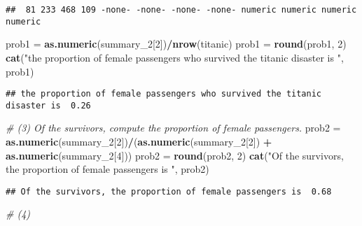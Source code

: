 \documentclass[]{article}
\newenvironment{Shaded}{\begin{snugshade}}{\end{snugshade}}
\newcommand{\KeywordTok}[1]{\textcolor[rgb]{0.13,0.29,0.53}{\textbf{#1}}}
\newcommand{\DecValTok}[1]{\textcolor[rgb]{0.00,0.00,0.81}{#1}}
\newcommand{\StringTok}[1]{\textcolor[rgb]{0.31,0.60,0.02}{#1}}
\newcommand{\CommentTok}[1]{\textcolor[rgb]{0.56,0.35,0.01}{\textit{#1}}}
\newcommand{\OperatorTok}[1]{\textcolor[rgb]{0.81,0.36,0.00}{\textbf{#1}}}
\newcommand{\NormalTok}[1]{#1}
\begin{document}
\begin{verbatim}
##  81 233 468 109 -none- -none- -none- -none- numeric numeric numeric numeric
\end{verbatim}

\begin{Shaded}
\begin{Highlighting}[]
\NormalTok{prob1 =}\StringTok{ }\KeywordTok{as.numeric}\NormalTok{(summary_}\DecValTok{2}\NormalTok{[}\DecValTok{2}\NormalTok{])}\OperatorTok{/}\KeywordTok{nrow}\NormalTok{(titanic)}
\NormalTok{prob1 =}\StringTok{ }\KeywordTok{round}\NormalTok{(prob1, }\DecValTok{2}\NormalTok{)}
\KeywordTok{cat}\NormalTok{(}\StringTok{"the proportion of female passengers who survived the titanic disaster is "}\NormalTok{, prob1)}
\end{Highlighting}
\end{Shaded}

\begin{verbatim}
## the proportion of female passengers who survived the titanic disaster is  0.26
\end{verbatim}

\begin{Shaded}
\begin{Highlighting}[]
\CommentTok{# (3) Of the survivors, compute the proportion of female passengers.}
\NormalTok{prob2 =}\StringTok{ }\KeywordTok{as.numeric}\NormalTok{(summary_}\DecValTok{2}\NormalTok{[}\DecValTok{2}\NormalTok{])}\OperatorTok{/}\NormalTok{(}\KeywordTok{as.numeric}\NormalTok{(summary_}\DecValTok{2}\NormalTok{[}\DecValTok{2}\NormalTok{]) }\OperatorTok{+}\StringTok{ }\KeywordTok{as.numeric}\NormalTok{(summary_}\DecValTok{2}\NormalTok{[}\DecValTok{4}\NormalTok{]))}
\NormalTok{prob2 =}\StringTok{ }\KeywordTok{round}\NormalTok{(prob2, }\DecValTok{2}\NormalTok{)}
\KeywordTok{cat}\NormalTok{(}\StringTok{"Of the survivors, the proportion of female passengers is "}\NormalTok{, prob2)}
\end{Highlighting}
\end{Shaded}

\begin{verbatim}
## Of the survivors, the proportion of female passengers is  0.68
\end{verbatim}

\begin{Shaded}
\begin{Highlighting}[]
\CommentTok{# (4) }
\end{Highlighting}
\end{Shaded}
\end{document}
